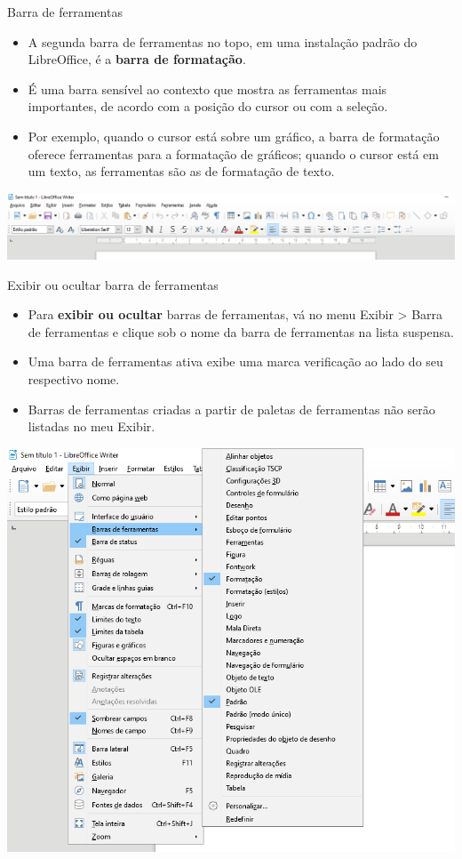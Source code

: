 \begin{frame}{Barra de ferramentas}
	\begin{block}{}
		\begin{itemize}
			\item A segunda barra de ferramentas no topo, em uma instalação padrão do LibreOffice, é a \textbf{barra de formatação}.
			\item É uma barra sensível ao contexto que mostra as ferramentas mais importantes, de acordo com a posição do cursor ou com a seleção.
			\item Por exemplo, quando o cursor está sobre um gráfico, a barra de formatação oferece ferramentas para a formatação de gráficos; quando o cursor está em um texto, as ferramentas são as de formatação de texto.
		\end{itemize}
	\end{block}

	\medskip

	\centering
	\includegraphics[width=1\linewidth]{Figuras/Ch04/fig10}
\end{frame}


\begin{frame}{Exibir ou ocultar barra de ferramentas}
	\begin{block}{}
		\begin{itemize}
			\item Para \textbf{exibir ou ocultar} barras de ferramentas, vá no menu Exibir > Barra de ferramentas e clique sob o nome da barra de ferramentas na lista suspensa.
			\item Uma barra de ferramentas ativa exibe uma marca verificação ao lado do seu respectivo nome.
			\item Barras de ferramentas criadas a partir de paletas de ferramentas não serão listadas no meu Exibir.
		\end{itemize}
	\end{block}

	\centering
	\includegraphics[width=0.5\linewidth]{Figuras/Ch04/fig11}
\end{frame}


